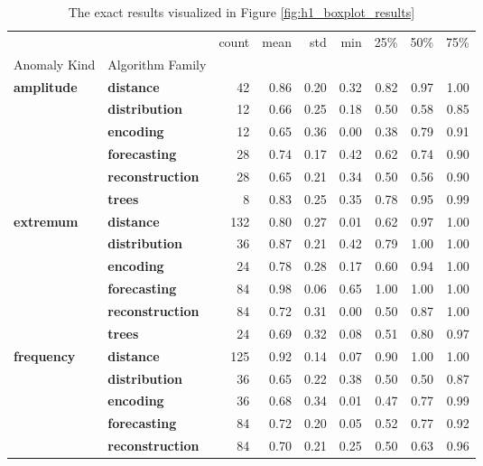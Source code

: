 \begin{table}
\centering
\caption{The exact results visualized in Figure \ref{fig:h1_boxplot_results}}
\label{tab:h1_boxplot_results}
\begin{tabular}{llrrrrrrr}
\toprule
 &  & count & mean & std & min & 25\% & 50\% & 75\% \\
Anomaly Kind & Algorithm Family &  &  &  &  &  &  &  \\
\midrule
\multirow[t]{6}{*}{\textbf{amplitude}} & \textbf{distance} & 42 & 0.86 & 0.20 & 0.32 & 0.82 & 0.97 & 1.00 \\
\textbf{} & \textbf{distribution} & 12 & 0.66 & 0.25 & 0.18 & 0.50 & 0.58 & 0.85 \\
\textbf{} & \textbf{encoding} & 12 & 0.65 & 0.36 & 0.00 & 0.38 & 0.79 & 0.91 \\
\textbf{} & \textbf{forecasting} & 28 & 0.74 & 0.17 & 0.42 & 0.62 & 0.74 & 0.90 \\
\textbf{} & \textbf{reconstruction} & 28 & 0.65 & 0.21 & 0.34 & 0.50 & 0.56 & 0.90 \\
\textbf{} & \textbf{trees} & 8 & 0.83 & 0.25 & 0.35 & 0.78 & 0.95 & 0.99 \\
\cline{1-9}
\multirow[t]{6}{*}{\textbf{extremum}} & \textbf{distance} & 132 & 0.80 & 0.27 & 0.01 & 0.62 & 0.97 & 1.00 \\
\textbf{} & \textbf{distribution} & 36 & 0.87 & 0.21 & 0.42 & 0.79 & 1.00 & 1.00 \\
\textbf{} & \textbf{encoding} & 24 & 0.78 & 0.28 & 0.17 & 0.60 & 0.94 & 1.00 \\
\textbf{} & \textbf{forecasting} & 84 & 0.98 & 0.06 & 0.65 & 1.00 & 1.00 & 1.00 \\
\textbf{} & \textbf{reconstruction} & 84 & 0.72 & 0.31 & 0.00 & 0.50 & 0.87 & 1.00 \\
\textbf{} & \textbf{trees} & 24 & 0.69 & 0.32 & 0.08 & 0.51 & 0.80 & 0.97 \\
\cline{1-9}
\multirow[t]{6}{*}{\textbf{frequency}} & \textbf{distance} & 125 & 0.92 & 0.14 & 0.07 & 0.90 & 1.00 & 1.00 \\
\textbf{} & \textbf{distribution} & 36 & 0.65 & 0.22 & 0.38 & 0.50 & 0.50 & 0.87 \\
\textbf{} & \textbf{encoding} & 36 & 0.68 & 0.34 & 0.01 & 0.47 & 0.77 & 0.99 \\
\textbf{} & \textbf{forecasting} & 84 & 0.72 & 0.20 & 0.05 & 0.52 & 0.77 & 0.92 \\
\textbf{} & \textbf{reconstruction} & 84 & 0.70 & 0.21 & 0.25 & 0.50 & 0.63 & 0.96 \\

\end{tabular}
\end{table}
